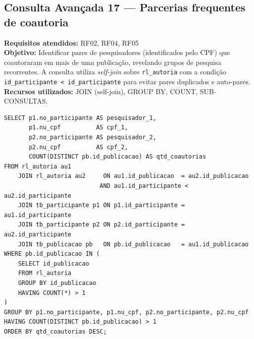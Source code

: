 \documentclass[12pt,a4paper]{article}
\begin{document}
\subsection{Consulta Avançada 17 --- Parcerias frequentes de coautoria}
\textbf{Requisitos atendidos:} RF02, RF04, RF05 \\
\textbf{Objetivo:} Identificar pares de pesquisadores (identificados pelo CPF) que coautoraram em mais de uma publicação, revelando grupos de pesquisa recorrentes. A consulta utiliza \emph{self-join} sobre \texttt{rl\_autoria} com a condição \texttt{id\_participante < id\_participante} para evitar pares duplicados e auto-pares. \\
\textbf{Recursos utilizados:} JOIN (self-join), GROUP BY, COUNT, SUB-CONSULTAS.
\begin{lstlisting}[caption={QA17 --- Parcerias frequentes de coautoria (pares com >1 publicação em comum).}]
SELECT p1.no_participante AS pesquisador_1,
       p1.nu_cpf          AS cpf_1,
       p2.no_participante AS pesquisador_2,
       p2.nu_cpf          AS cpf_2,
       COUNT(DISTINCT pb.id_publicacao) AS qtd_coautorias
FROM rl_autoria au1
    JOIN rl_autoria au2     ON au1.id_publicacao  = au2.id_publicacao
                           AND au1.id_participante < au2.id_participante
    JOIN tb_participante p1 ON p1.id_participante = au1.id_participante
    JOIN tb_participante p2 ON p2.id_participante = au2.id_participante
    JOIN tb_publicacao pb   ON pb.id_publicacao   = au1.id_publicacao
WHERE pb.id_publicacao IN (
    SELECT id_publicacao
    FROM rl_autoria
    GROUP BY id_publicacao
    HAVING COUNT(*) > 1
)
GROUP BY p1.no_participante, p1.nu_cpf, p2.no_participante, p2.nu_cpf
HAVING COUNT(DISTINCT pb.id_publicacao) > 1
ORDER BY qtd_coautorias DESC;
\end{lstlisting}
\end{document}
